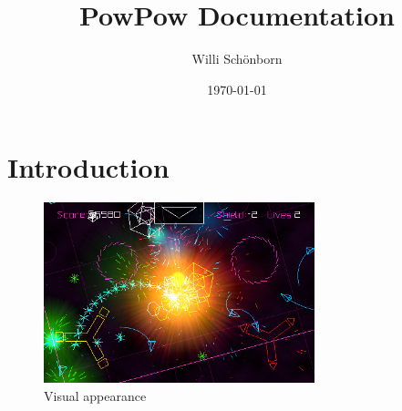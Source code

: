 \documentclass[a4paper]{article}
\title{PowPow Documentation}
\author{Willi Schönborn}
\date{\today}
\begin{document}
\maketitle
\newpage

\tableofcontents
\newpage

\section{Introduction}

\begin{figure}[htbp]
\centering
\includegraphics[width=0.7\textwidth]{PewPew-iPhone-App-Review.jpg}
\caption{Visual appearance}
\end{figure}

\inputminted[firstline=20, lastline=36]{scala}{../scala/org/whiskeysierra/powpow/Ship.scala}

\newpage
\nocite{pewpewgame}
\nocite{jinput}
\printbibliography
\listoffigures
\end{document}

